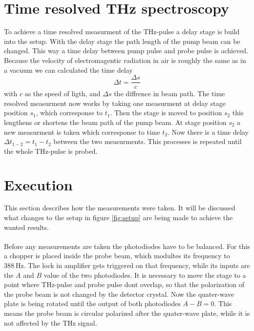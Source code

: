 \section{Time resolved THz spectroscopy}
\label{sec:time_domain}
To achieve a time resolved measurment of the $\si{\tera\hertz}$-pulse a delay stage is build into the setup.
With the delay stage the path length of the pump beam can be changed.
This way a time delay between pump pulse and probe pulse is achieved.
Because the velocity of electromagentic radiation in air is roughly the same as in a vacuum we can calculated the time delay   
\begin{equation}
    \Delta t = \frac{\Delta s}{c}
\end{equation}
with $c$ as the speed of ligth, and $\Delta s$ the diffrence in beam path.
The time resolved measurment now works by taking one measurment at delay stage position $s_1$, which corresponse to $t_1$.
Then the stage is moved to position $s_2$ this lengthens or shortens the beam path of the pump beam.
At stage position $s_2$ a new measurment is taken which corresponse to time $t_2$.
Now there is a time delay $\Delta t_{1-2} = t_1 - t_2$ between the two measurments.
This processes is repeated until the whole $\si{\tera\hertz}$-pulse is probed.

\section{Execution}
This section describes how the measurements were taken. 
It will be discussed what changes to the setup in figure \ref{fig:setup} are being made to achieve the wanted results.
\\\\
Before any measurements are taken the photodiodes have to be balanced.
For this a chopper is placed inside the probe beam, which modultes its frequency to $\SI{388}{\hertz}$.
The lock in amplifier gets triggered on that frequency, while its inputs are the $A$ and $B$ value of the two photodiodes.
It is necessary to move the stage to a point where $\si{\tera\hertz}$-pulse and probe pulse dont overlap, so that the polarization of the probe beam is not changed by the detector crystal.
Now the quater-wave plate is being rotated until the output of both photodiodes $A-B = 0$. 
This means the probe beam is circular polarized after the quater-wave plate, while it is not affected by the $\si{\tera\hertz}$ signal.

